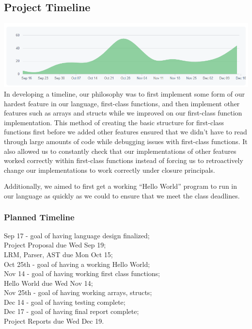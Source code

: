 \documentclass[12pt]{article}
\begin{document}
\subsection{Project Timeline}
\includegraphics[width=150mm,scale=1]{githubproject.png}\\
In developing a timeline, our philosophy was to first implement some form of our hardest feature in our language, first-class functions, and then implement other features such as arrays and structs while we improved on our first-class function implementation. This method of creating the basic structure for first-class functions first before we added other features ensured that we didn’t have to read through large amounts of code while debugging issues with first-class functions. It also allowed us to constantly check that our implementations of other features worked correctly within first-class functions instead of forcing us to retroactively change our implementations to work correctly under closure principals. 

Additionally, we aimed to first get a working “Hello World” program to run in our language as quickly as we could to ensure that we meet the class deadlines. 

\subsubsection{Planned Timeline}
Sep 17 - goal of having language design finalized; \\
Project Proposal due Wed Sep 19; \\
LRM, Parser, AST due Mon Oct 15; \\
Oct 25th - goal of having a working Hello World; \\
Nov 14 - goal of having working first class functions;\\
Hello World due Wed Nov 14;\\
Nov 25th - goal of having working arrays, structs;\\
Dec 14 - goal of having testing complete;\\
Dec 17 - goal of having final report complete;\\
Project Reports due Wed Dec 19.\\
\\
\end{document}
